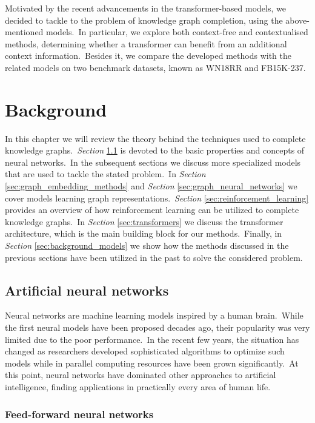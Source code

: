 \documentclass[longabstract, english, mgr]{iithesis}
\newcommand\numberedchapter[1]{\setlength\topskip{3cm}\chapter{#1}\setlength\topskip{0cm}}
\theoremstyle{default_theorem_style}\newtheorem{theorem}{Theorem}
\theoremstyle{default_theorem_style}\newtheorem{definition}{Definition}
\begin{document}
\noindent Motivated by the recent advancements in the transformer-based models, we decided to tackle to the problem
of knowledge graph completion, using the above-mentioned models.\ In particular, we explore both
context-free and contextualised methods, determining whether a transformer can benefit from an additional context
information.\ Besides it, we compare the developed methods with the related models on two benchmark datasets, known
as WN18RR and FB15K-237.

\numberedchapter{Background}\label{chapter:background}

In this chapter we will review the theory behind the techniques used to complete knowledge
graphs.\ \textit{Section} \ref{sec:neural_networks}
is devoted to the basic properties and concepts of neural networks.\ In the subsequent sections we discuss more
specialized models that are used to tackle the stated problem.\ In
\textit{Section} \ref{sec:graph_embedding_methods} and \textit{Section} \ref{sec:graph_neural_networks} we cover
models learning graph representations.\ \textit{Section} \ref{sec:reinforcement_learning} provides an overview of
how reinforcement learning can be utilized to complete knowledge graphs.\ In \textit{Section}
\ref{sec:transformers} we discuss the transformer architecture, which is the main building block for our
methods.\ Finally, in \textit{Section} \ref{sec:background_models} we show how the methods discussed in the previous
sections have been utilized in the past to solve the considered problem.

\section{Artificial neural networks}\label{sec:neural_networks}

Neural networks are machine learning models inspired by a human brain.\ While the first neural models have
been proposed decades ago, their popularity was very limited due to the poor performance.\ In the recent
few years, the situation has changed as researchers developed sophisticated algorithms to optimize such models while
in parallel computing resources have been grown significantly.\ At this point, neural networks have dominated other
approaches to artificial intelligence, finding applications in practically every area of human life.

\subsection{Feed-forward neural networks}\label{subsec:feed_forward}
\end{document}
